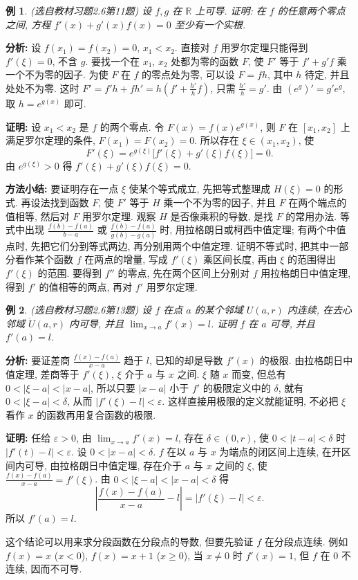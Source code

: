 \documentclass[UTF8,openany]{ctexbook}
\theoremstyle{chinesetextbook}
\newtheorem{example}{例}[section]
\newenvironment{cnproof}{\par\indent\textbf{证明:} \ignorespaces}{\par}
\begin{document}
\begin{example}\label{ex:c2-h6-11}
\textnormal{(选自教材习题2.6第11题)} 设 $f,g$ 在 $\mathbb R$ 上可导. 证明: 在 $f$ 的任意两个零点之间, 方程 $f'(x)+g'(x)f(x)=0$ 至少有一个实根.
\end{example}
\par\indent\textbf{分析:} 设 $f(x_1)=f(x_2)=0$, $x_1<x_2$. 直接对 $f$ 用罗尔定理只能得到 $f'(\xi)=0$, 不含 $g$. 要找一个在 $x_1$, $x_2$ 处都为零的函数 $F$, 使 $F'$ 等于 $f'+g'f$ 乘一个不为零的因子. 为使 $F$ 在 $f$ 的零点处为零, 可以设 $F=fh$, 其中 $h$ 待定, 并且处处不为零. 这时 $\displaystyle F'=f'h+fh'=h\left(f'+\frac{h'}hf\right)$, 只需 $\displaystyle\frac{h'}h=g'$. 由 $(e^{g})'=g'e^{g}$, 取 $h=e^{g(x)}$ 即可.
\begin{cnproof}
设 $x_1<x_2$ 是 $f$ 的两个零点. 令 $F(x)=f(x)e^{g(x)}$, 则 $F$ 在 $[x_1,x_2]$ 上满足罗尔定理的条件, $F(x_1)=F(x_2)=0$. 所以存在 $\xi\in(x_1,x_2)$, 使
\[
F'(\xi)=e^{g(\xi)}\bigl[f'(\xi)+g'(\xi)f(\xi)\bigr]=0.
\]
由 $e^{g(\xi)}>0$ 得 $f'(\xi)+g'(\xi)f(\xi)=0$.
\end{cnproof}
\par\indent\textbf{方法小结:} 要证明存在一点 $\xi$ 使某个等式成立, 先把等式整理成 $H(\xi)=0$ 的形式. 再设法找到函数 $F$, 使 $F'$ 等于 $H$ 乘一个不为零的因子, 并且 $F$ 在两个端点的值相等, 然后对 $F$ 用罗尔定理. 观察 $H$ 是否像乘积的导数, 是找 $F$ 的常用办法. 等式中出现 $\displaystyle\frac{f(b)-f(a)}{b-a}$ 或 $\displaystyle\frac{f(b)-f(a)}{g(b)-g(a)}$ 时, 用拉格朗日或柯西中值定理; 有两个中值点时, 先把它们分到等式两边, 再分别用两个中值定理. 证明不等式时, 把其中一部分看作某个函数 $f$ 在两点的增量, 写成 $f'(\xi)$ 乘区间长度, 再由 $\xi$ 的范围得出 $f'(\xi)$ 的范围. 要得到 $f''$ 的零点, 先在两个区间上分别对 $f$ 用拉格朗日中值定理, 得到 $f'$ 的值相等的两点, 再对 $f'$ 用罗尔定理.
\begin{example}\label{ex:c2-h6-13}
\textnormal{(选自教材习题2.6第13题)} 设 $f$ 在点 $a$ 的某个邻域 $U(a,r)$ 内连续, 在去心邻域 $\mathring U(a,r)$ 内可导, 并且 $\displaystyle\lim_{x\to a}f'(x)=l$. 证明 $f$ 在 $a$ 可导, 并且 $f'(a)=l$.
\end{example}
\par\indent\textbf{分析:} 要证差商 $\displaystyle\frac{f(x)-f(a)}{x-a}$ 趋于 $l$, 已知的却是导数 $f'(x)$ 的极限. 由拉格朗日中值定理, 差商等于 $f'(\xi)$, $\xi$ 介于 $a$ 与 $x$ 之间. $\xi$ 随 $x$ 而变, 但总有 $0<|\xi-a|<|x-a|$, 所以只要 $|x-a|$ 小于 $f'$ 的极限定义中的 $\delta$, 就有 $0<|\xi-a|<\delta$, 从而 $|f'(\xi)-l|<\varepsilon$. 这样直接用极限的定义就能证明, 不必把 $\xi$ 看作 $x$ 的函数再用复合函数的极限.
\begin{cnproof}
任给 $\varepsilon>0$, 由 $\displaystyle\lim_{x\to a}f'(x)=l$, 存在 $\delta\in(0,r)$, 使 $0<|t-a|<\delta$ 时 $|f'(t)-l|<\varepsilon$. 设 $0<|x-a|<\delta$. $f$ 在以 $a$ 与 $x$ 为端点的闭区间上连续, 在开区间内可导, 由拉格朗日中值定理, 存在介于 $a$ 与 $x$ 之间的 $\xi$, 使 $\displaystyle\frac{f(x)-f(a)}{x-a}=f'(\xi)$. 由 $0<|\xi-a|<|x-a|<\delta$ 得
\[
\left|\frac{f(x)-f(a)}{x-a}-l\right|=|f'(\xi)-l|<\varepsilon.
\]
所以 $f'(a)=l$.
\end{cnproof}
这个结论可以用来求分段函数在分段点的导数, 但要先验证 $f$ 在分段点连续. 例如 $f(x)=x$ ($x<0$), $f(x)=x+1$ ($x\ge0$), 当 $x\ne0$ 时 $f'(x)=1$, 但 $f$ 在 $0$ 不连续, 因而不可导.
\end{document}
